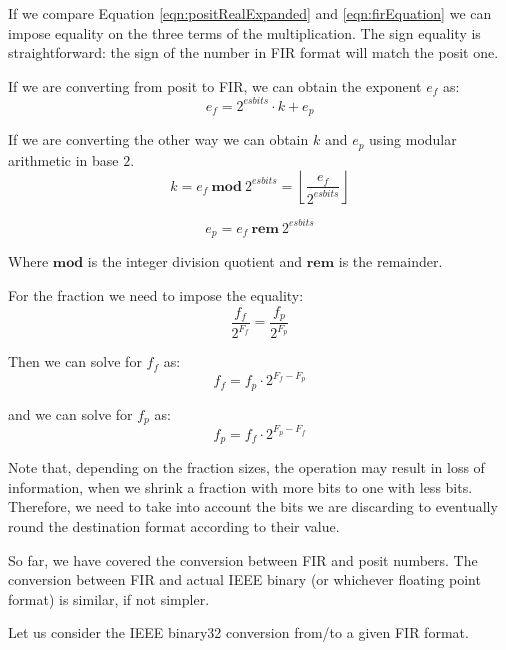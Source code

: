 If we compare Equation \eqref{eqn:positRealExpanded} and \eqref{eqn:firEquation} we can impose equality on the three terms of the multiplication. The sign equality is straightforward: the sign of the number in FIR format will match the posit one.

If we are converting from posit to FIR, we can obtain the exponent $e_f$ as:
\begin{equation}
    e_f = 2^{esbits} \cdot k + e_p
\end{equation}

If we are converting the other way we can obtain $k$ and $e_p$ using modular arithmetic in base $2$.
\begin{equation}
    k = e_f\ \mathbf{mod}\ 2^{esbits} = \left\lfloor \frac{e_f}{2^{esbits}} \right\rfloor
\end{equation}

\begin{equation}
    e_p = e_f\ \mathbf{rem}\ 2^{esbits}
\end{equation}

Where $\mathbf{mod}$ is the integer division quotient and $\mathbf{rem}$ is the remainder.

For the fraction we need to impose the equality:
\begin{equation}\label{eqn:fractionalPartEquivalence}
    \frac{f_f}{2^{F_f}} = \frac{f_p}{2^{F_p}}
\end{equation}

Then we can solve for $f_f$ as:
\begin{equation}
    f_f = f_p \cdot 2^{F_f - F_p}
\end{equation}

and we can solve for $f_p$ as:
\begin{equation}
    f_p = f_f \cdot 2^{F_p - F_f}
\end{equation}

Note that, depending on the fraction sizes, the operation may result in loss of information, when we shrink a fraction with more bits to one with less bits.  Therefore, we need to take into account the bits we are discarding to eventually round the destination format according to their value.

So far, we have covered the conversion between FIR and posit numbers. The conversion between FIR and actual IEEE binary (or whichever floating point format) is similar, if not simpler.

Let us consider the IEEE binary32 conversion from/to a given FIR format. 

